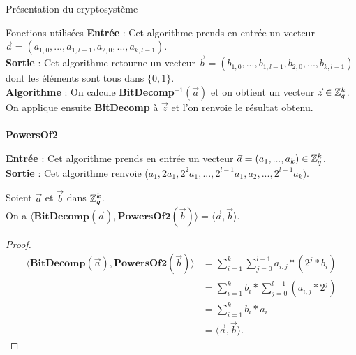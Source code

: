 \begin{section}{Présentation du cryptosystème}
\begin{subsection}{Fonctions utilisées}
	\textbf{Entrée} : Cet algorithme prends en entrée un vecteur $\vec{a} = (a_{1,0}, ..., a_{1,l-1}, a_{2,0}, ..., a_{k,l-1})$. \\
	\textbf{Sortie} : Cet algorithme retourne un vecteur $\vec{b} = (b_{1,0}, ..., b_{1,l-1}, b_{2,0}, ..., b_{k,l-1})$ dont les éléments sont tous dans $\{ 0,1\} $. \\
	\textbf{Algorithme} : On calcule \textbf{BitDecomp}$^{-1}(\vec{a})$ et on obtient un vecteur $\vec{z} \in \mathbb{Z}_q^{k}$. On applique ensuite \textbf{BitDecomp} à $\vec{z}$ et l'on renvoie le résultat obtenu.
	
	\paragraph{}
	\textbf{PowersOf2}
	\flushleft

	\textbf{Entrée} : Cet algorithme prends en entrée un vecteur $\vec{a} = (a_1, ..., a_k) \in \mathbb{Z}_q^{k}$. \\
	\textbf{Sortie} : Cet algorithme renvoie ($a_1, 2 a_1, 2^{2} a_1, ..., 2^{l-1} a_1, a_2, ..., 2^{l-1} a_k)$. \\
	
	\begin{prop}
	Soient $\vec{a}$ et $\vec{b}$ dans $\mathbb{Z}_q^{k}$. \\
	On a $\langle \textbf{BitDecomp}(\vec{a}), \textbf{PowersOf2}(\vec{b}) \rangle = \langle\vec{a},\vec{b} \rangle$.
	\end{prop}
	\begin{proof}
	\begin{align*}
	\langle \textbf{BitDecomp}(\vec{a}), \textbf{PowersOf2}(\vec{b}) \rangle &= \sum\limits_{i=1}^{k} \sum\limits_{j=0}^{l-1} a_{i,j} * (2^{j} * b_i) \\
	&= \sum\limits_{i=1}^{k} b_i * \sum\limits_{j=0}^{l-1} (a_{i,j} * 2^{j}) \\
	&= \sum\limits_{i=1}^{k} b_i * a_i \\
	&= \langle\vec{a},\vec{b} \rangle.
	\end{align*}
	\end{proof}
	

\end{subsection}
\end{section}

